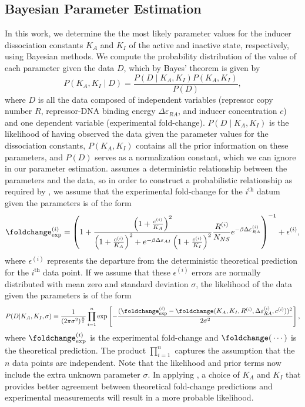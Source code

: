 \subsection*{Bayesian Parameter Estimation}

In this work, we determine the the most likely parameter values for the inducer
dissociation constants $K_A$ and $K_I$ of the active and inactive state,
respectively, using Bayesian methods. We compute the probability distribution of
the value of each parameter given the data $D$, which by Bayes' theorem is given
by
\begin{equation}\label{bayes_theorem}
	P(K_A, K_I \mid D) = \frac{P(D \mid K_A, K_I)P(K_A, K_I)}{P(D)},
\end{equation}
where $D$ is all the data composed of independent variables (repressor copy
number $R$, repressor-DNA binding energy $\Delta\varepsilon_{RA}$, and inducer
concentration $c$) and one dependent variable (experimental fold-change). $P(D
\mid K_A, K_I)$ is the likelihood of having observed the data given the
parameter values for the dissociation constants, $P(K_A, K_I)$ contains all the
prior information on these parameters, and $P(D)$ serves as a normalization
constant, which we can ignore in our parameter estimation.
 assumes a deterministic relationship between the
parameters and the data, so in order to construct a probabilistic relationship
as required by , we assume that the experimental fold-change
for the $i^\text{th}$ datum given the parameters is of the form
\begin{equation}
\foldchange _{\exp}^{(i)} = \left( 1 + \frac{\left(1 +
\frac{c^{(i)}}{K_A}\right)^2}{\left( 1 + \frac{c^{(i)}}{K_A}\right)^2 +
e^{-\beta \Delta \varepsilon_{AI}} \left(1 + \frac{c^{(i)}}{K_I} \right)^2} \frac{R^{(i)}}{N_{NS}} e^{-\beta
\Delta \varepsilon_{RA}^{(i)}}\right)^{-1} + \epsilon^{(i)},
\label{eq_fold_change_exp}
\end{equation}
where $\epsilon^{(i)}$ represents the departure from the deterministic
theoretical prediction for the $i^\text{th}$ data point. If we assume that these
$\epsilon^{(i)}$ errors are normally distributed with mean zero and standard
deviation $\sigma$, the likelihood of the data given the parameters is of the
form
\begin{equation} \label{eq_likelihood}
P(D \vert K_A, K_I, \sigma) =
\frac{1}{(2\pi\sigma^2)^{\frac{n}{2}}}\prod\limits_{i=1}^n \exp
\left[-\frac{(\foldchange^{(i)}_{\exp} - \foldchange(K_A, K_I, R^{(i)},
	\Delta\varepsilon_{RA}^{(i)}, c^{(i)}))^2}{2\sigma^2}\right],
\end{equation}
where $\foldchange^{(i)}_{\text{exp}}$ is the experimental fold-change and
$\foldchange(\,\cdots)$ is the theoretical prediction. The product
$\prod_{i=1}^n$ captures the assumption that the $n$ data points are
independent. Note that the likelihood and prior terms now include the extra
unknown parameter $\sigma$. In applying \eref[eq_likelihood], a choice of $K_A$
and $K_I$ that provides better agreement between theoretical fold-change
predictions and experimental measurements will result in a more probable
likelihood.

